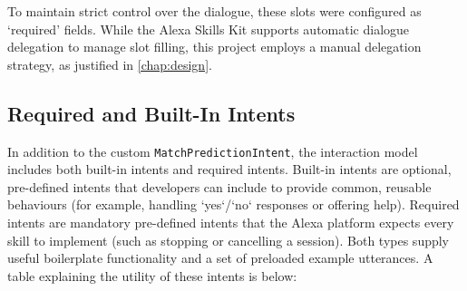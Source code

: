 To maintain strict control over the dialogue, these slots were configured as `required' fields. While the Alexa Skills Kit supports automatic dialogue delegation to manage slot filling, this project employs a manual delegation strategy, as justified in \autoref{chap:design}.

\subsection{Required and Built-In Intents}
In addition to the custom \texttt{MatchPredictionIntent}, the interaction model includes both built-in intents and required intents. Built-in intents are optional, pre-defined intents that developers can include to provide common, reusable behaviours (for example, handling `yes`/`no` responses or offering help). Required intents are mandatory pre-defined intents that the Alexa platform expects every skill to implement (such as stopping or cancelling a session). Both types supply useful boilerplate functionality and a set of preloaded example utterances. A table explaining the utility of these intents is below:

